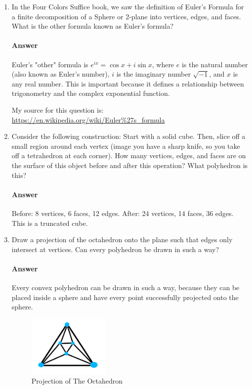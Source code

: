 \documentclass{article}
\begin{document}
\begin{enumerate}

    \item In the Four Colors Suffice book, we saw the definition of Euler's
        Formula for a finite decomposition of a Sphere or 2-plane into vertices,
        edges, and faces.  What is the other formula known as Euler's formula?

        \paragraph{Answer}

        Euler's "other" formula is $e^{ix} = \cos x + i \sin x$, where $e$ is the natural number (also known as Euler's number), $i$ is the imaginary number $\sqrt{-1}$, and $x$ is any real number. This is important because it defines a relationship between trigonometry and the complex exponential function.

        My source for this question is: \url{https://en.wikipedia.org/wiki/Euler%27s_formula}
        
    \item  Consider the following construction: Start with a solid cube.  Then, slice
        off a small region around each vertex (image you have a sharp knife, so you take
        off a tetrahedron at each corner).  How many vertices, edges, and faces are on
        the surface of this object before and after this operation? What polyhedron is this?

        \paragraph{Answer} 
        Before: 8 vertices, 6 faces, 12 edges. After: 24 vertices, 14 faces, 36 edges.
        This is a truncated cube.



    \item Draw a projection of the octahedron onto the plane such that edges only
        intersect at vertices.  Can every polyhedron be drawn in such a way?

        \paragraph{Answer}
        Every convex polyhedron can be drawn in such a way, because they can be placed inside a sphere and have every point successfully projected onto the sphere.
        \begin{figure}[b!]
            \centering
            \includegraphics[width=150px]{octahedron.png}
            \caption{Projection of The Octahedron}
            \label{fig:Octahedron}
          \end{figure}


\end{enumerate}
\end{document}
